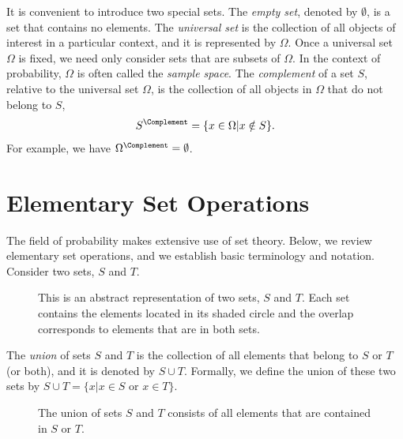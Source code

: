 It is convenient to introduce two special sets.
The \emph{empty set}, denoted by $\emptyset$, is a set that contains no elements.
The \emph{universal set} is the collection of all objects of interest in a particular context, and it is represented by $\Omega$.
Once a universal set $\Omega$ is fixed, we need only consider sets that are subsets of $\Omega$.
In the context of probability, $\Omega$ is often called the \emph{sample space}.
The \emph{complement} of a set $S$, relative to the universal set $\Omega$, is the collection of all objects in $\Omega$ that do not belong to $S$,
\begin{equation*}
S^{\Complement} = \{ x \in \Omega | x \notin S \}.
\end{equation*}
For example, we have $\Omega^{\Complement} = \emptyset$.


\section{Elementary Set Operations}

The field of probability makes extensive use of set theory.
Below, we review elementary set operations, and we establish basic terminology and notation.
Consider two sets, $S$ and $T$.

\begin{figure}[htb!]
\begin{center}
\caption{This is an abstract representation of two sets, $S$ and $T$.
Each set contains the elements located in its shaded circle and the overlap corresponds to elements that are in both sets.}
\end{center}
\end{figure}

The \emph{union} of sets $S$ and $T$ is the collection of all elements that belong to $S$ or $T$ (or both), and it is denoted by $S \cup T$.
Formally, we define the union of these two sets by $S \cup T = \{ x | x \in S \text{ or } x \in T \}$.

\begin{figure}[htb!]
\begin{center}
\caption{The union of sets $S$ and $T$ consists of all elements that are contained in $S$ or $T$.}
\end{center}
\end{figure}

